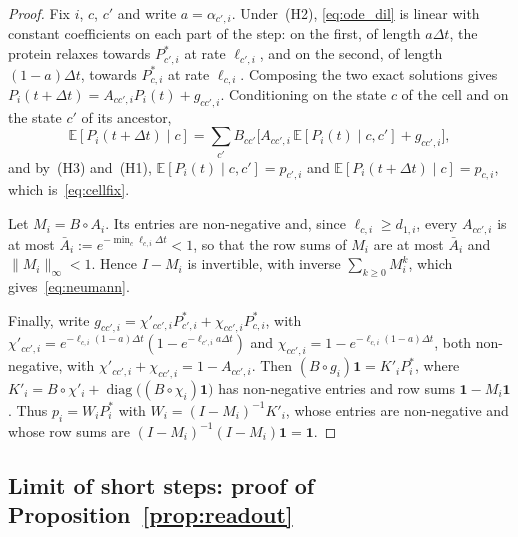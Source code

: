 \documentclass[a4paper, 11pt]{article}
\DeclareMathOperator{\diag}{diag}
\newcommand{\E}{\mathbb{E}}
\theoremstyle{plain}
\theoremstyle{remark}
\begin{document}
\begin{proof}
Fix $i$, $c$, $c'$ and write $a = \alpha_{c',i}$. Under~(H2), \eqref{eq:ode_dil} is linear with constant coefficients on each part of the step: on the first, of length $a\Delta t$, the protein relaxes towards $P^\ast_{c',i}$ at rate $\ell_{c',i}$, and on the second, of length $(1-a)\Delta t$, towards $P^\ast_{c,i}$ at rate $\ell_{c,i}$. Composing the two exact solutions gives $P_i(t+\Delta t) = A_{cc',i}P_i(t) + g_{cc',i}$. Conditioning on the state $c$ of the cell and on the state $c'$ of its ancestor,
\[
\E[P_i(t+\Delta t) \mid c] = \sum_{c'} B_{cc'}\bigl[A_{cc',i}\,\E[P_i(t) \mid c, c'] + g_{cc',i}\bigr],
\]
and by~(H3) and~(H1), $\E[P_i(t) \mid c, c'] = p_{c',i}$ and $\E[P_i(t+\Delta t) \mid c] = p_{c,i}$, which is~\eqref{eq:cellfix}.

Let $M_i = B\circ A_i$. Its entries are non-negative and, since $\ell_{c,i} \geq d_{1,i}$, every $A_{cc',i}$ is at most $\bar A_i := e^{-\min_c \ell_{c,i}\Delta t} < 1$, so that the row sums of $M_i$ are at most $\bar A_i$ and $\|M_i\|_\infty < 1$. Hence $I - M_i$ is invertible, with inverse $\sum_{k\geq 0}M_i^k$, which gives~\eqref{eq:neumann}.

Finally, write $g_{cc',i} = \chi'_{cc',i}P^\ast_{c',i} + \chi_{cc',i}P^\ast_{c,i}$, with $\chi'_{cc',i} = e^{-\ell_{c,i}(1-a)\Delta t}(1 - e^{-\ell_{c',i}a\Delta t})$ and $\chi_{cc',i} = 1 - e^{-\ell_{c,i}(1-a)\Delta t}$, both non-negative, with $\chi'_{cc',i} + \chi_{cc',i} = 1 - A_{cc',i}$. Then $(B\circ g_i)\mathbf{1} = K'_iP^\ast_i$, where $K'_i = B\circ\chi'_i + \diag\bigl((B\circ\chi_i)\mathbf{1}\bigr)$ has non-negative entries and row sums $\mathbf{1} - M_i\mathbf{1}$. Thus $p_i = W_iP^\ast_i$ with $W_i = (I - M_i)^{-1}K'_i$, whose entries are non-negative and whose row sums are $(I - M_i)^{-1}(I - M_i)\mathbf{1} = \mathbf{1}$.
\end{proof}

\subsection{Limit of short steps: proof of Proposition~\ref{prop:readout}}\label{sup:limit}
\end{document}
